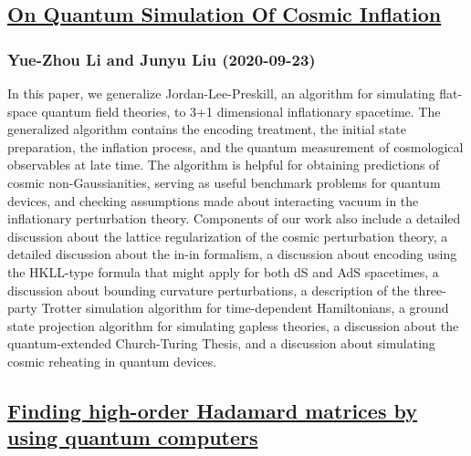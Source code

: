 {\subsection*{\href{http://arxiv.org/abs/2009.10921v2}{On Quantum Simulation Of Cosmic Inflation}}
\subsubsection*{Yue-Zhou Li and Junyu Liu (2020-09-23)}
In this paper, we generalize Jordan-Lee-Preskill, an algorithm for simulating
flat-space quantum field theories, to 3+1 dimensional inflationary spacetime.
The generalized algorithm contains the encoding treatment, the initial state
preparation, the inflation process, and the quantum measurement of cosmological
observables at late time. The algorithm is helpful for obtaining predictions of
cosmic non-Gaussianities, serving as useful benchmark problems for quantum
devices, and checking assumptions made about interacting vacuum in the
inflationary perturbation theory.
  Components of our work also include a detailed discussion about the lattice
regularization of the cosmic perturbation theory, a detailed discussion about
the in-in formalism, a discussion about encoding using the HKLL-type formula
that might apply for both dS and AdS spacetimes, a discussion about bounding
curvature perturbations, a description of the three-party Trotter simulation
algorithm for time-dependent Hamiltonians, a ground state projection algorithm
for simulating gapless theories, a discussion about the quantum-extended
Church-Turing Thesis, and a discussion about simulating cosmic reheating in
quantum devices.

\subsection*{\href{http://arxiv.org/abs/2009.10919v1}{Finding high-order Hadamard matrices by using quantum computers}}
}

